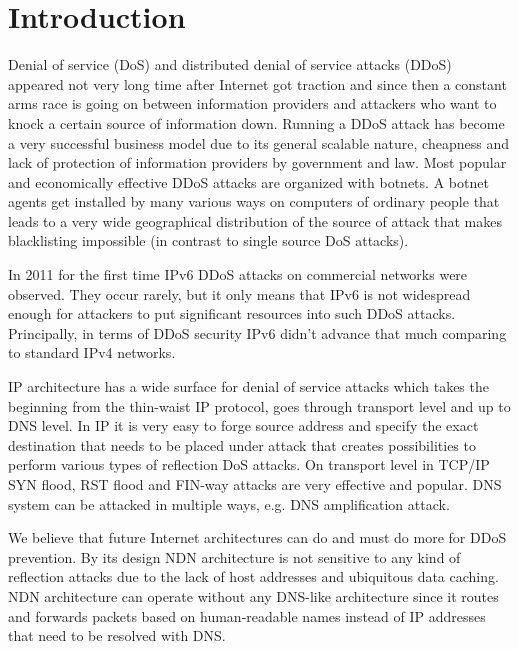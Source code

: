 \section{Introduction \label{intro}}
Denial of service (DoS) and distributed denial of service attacks (DDoS) appeared not very long time after Internet got traction and since then a constant arms race is going on between information providers and attackers who want to knock a certain source of information down. Running a DDoS attack has become a very successful business model due to its general scalable nature, cheapness and lack of protection of information providers by government and law. Most popular and economically effective DDoS attacks are organized with botnets. A botnet agents get installed by many various ways on computers of ordinary people that leads to a very wide geographical distribution of the source of attack that makes blacklisting impossible (in contrast to single source DoS attacks).

In 2011 for the first time IPv6 DDoS attacks on commercial networks were observed. They occur rarely, but it only means that IPv6 is not widespread enough for attackers to put significant resources into such DDoS attacks. Principally, in terms of DDoS security IPv6 didn't advance that much comparing to standard IPv4 networks.

IP architecture has a wide surface for denial of service attacks which takes the beginning from the thin-waist IP protocol, goes through transport level and up to DNS level. In IP it is very easy to forge source address and specify the exact destination that needs to be placed under attack that creates possibilities to perform various types of reflection DoS attacks. On transport level in TCP/IP SYN flood, RST flood and FIN-way attacks are very effective and popular. DNS system can be attacked in multiple ways, e.g. DNS amplification attack. 

We believe that future Internet architectures can do and must do more for DDoS prevention. By its design NDN architecture is not sensitive to any kind of reflection attacks due to the lack of host addresses and ubiquitous data caching. NDN architecture can operate without any DNS-like architecture since it routes and forwards packets based on human-readable names instead of IP addresses that need to be resolved with DNS. 
  

